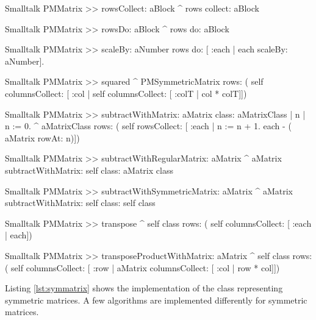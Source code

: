 \begin{displaycode}{Smalltalk}
PMMatrix >> rowsCollect: aBlock
    ^ rows collect: aBlock
\end{displaycode}

\begin{displaycode}{Smalltalk}
PMMatrix >> rowsDo: aBlock
    ^ rows do: aBlock
\end{displaycode}

\begin{displaycode}{Smalltalk}
PMMatrix >> scaleBy: aNumber
    rows do: [ :each | each scaleBy: aNumber].
\end{displaycode}

\begin{displaycode}{Smalltalk}
PMMatrix >> squared
    ^ PMSymmetricMatrix rows: ( self columnsCollect: [ :col | self 
                               columnsCollect: [ :colT | col * colT]])
\end{displaycode}

\begin{displaycode}{Smalltalk}
PMMatrix >> subtractWithMatrix: aMatrix class: aMatrixClass
    | n |
    n := 0.
    ^ aMatrixClass rows: ( self rowsCollect: [ :each | n := n + 1. 
                                          each - ( aMatrix rowAt: n)])
\end{displaycode}

\begin{displaycode}{Smalltalk}
PMMatrix >> subtractWithRegularMatrix: aMatrix
    ^ aMatrix subtractWithMatrix: self class: aMatrix class
\end{displaycode}

\begin{displaycode}{Smalltalk}
PMMatrix >> subtractWithSymmetricMatrix: aMatrix
    ^ aMatrix subtractWithMatrix: self class: self class
\end{displaycode}

\begin{displaycode}{Smalltalk}
PMMatrix >> transpose
    ^ self class rows: ( self columnsCollect: [ :each | each])
\end{displaycode}

\begin{displaycode}{Smalltalk}
PMMatrix >> transposeProductWithMatrix: aMatrix
    ^ self class rows: ( self columnsCollect: [ :row | aMatrix 
                                 columnsCollect: [ :col | row * col]])
\end{displaycode}

Listing \ref{lst:symmatrix} shows the implementation of the class  representing symmetric matrices.
A few algorithms are implemented differently for symmetric matrices.

